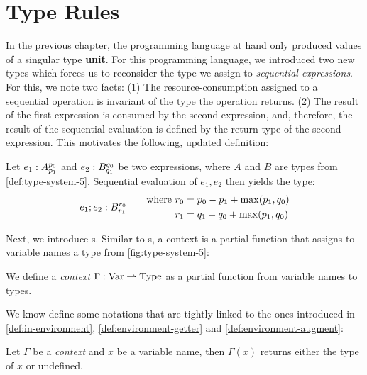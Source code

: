 \section{Type Rules}\label{sec:type-rules-5}

In the previous chapter, the programming language at hand only produced values of a singular type \textbf{unit}. For this programming language, we introduced two new types which forces us to reconsider the type we assign to \emph{sequential expressions}. For this, we note two facts: (1) The resource-consumption assigned to a sequential operation is invariant of the type the operation returns. (2) The result of the first expression is consumed by the second expression, and, therefore, the result of the sequential evaluation is defined by the return type of the second expression. This motivates the following, updated definition:

\begin{definition}
   Let \(e_1 : A ^{p_0}_{p_1}\) and \(e_2 : B ^{q_0}_{q_1}\) be two expressions, where \(A\) and \(B\) are types from \cref{def:type-system-5}. Sequential evaluation of \(e_1, e_2\) then yields the type:
   \[
      e_1;e_2 : B ^{r_0}_{r_1}
      \qquad
      \begin{aligned}
	 \text{where }	&r_0 = p_0 - p_1 + \max(p_1, q_0) \\
			&r_1 = q_1 - q_0 + \max(p_1, q_0)
      \end{aligned}
   \]
\end{definition}

Next, we introduce s. Similar to s, a context is a partial function that assigns to variable names a type from \cref{fig:type-system-5}:

\begin{definition}[Context]\label{def:context}
   We define a \emph{context} \(\Gamma : \text{Var} \rightharpoonup \text{Type}\) as a partial function from variable names to types.
\end{definition}

We know define some notations that are tightly linked to the ones introduced in \cref{def:in-environment}, \cref{def:environment-getter} and \cref{def:environment-augment}:


\begin{definition}\label{def:context-getter}
   Let \(\Gamma\) be a \emph{context} and \(x\) be a variable name, then \(\Gamma(x)\) returns either the type of \(x\) or undefined.
\end{definition}

